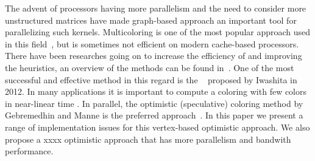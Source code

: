 The advent of processors having more parallelism and the need to consider more unstructured matrices have made graph-based approach an important tool for parallelizing such kernels. Multicoloring is one of the most popular approach used in this field~\cite{MC}, but is sometimes not efficient on modern cache-based processors. There have been researches going on to increase the efficiency of \MCfull and improving the heuristics, an overview of the methods can be found in~\cite{equitable_color,dist_k_def,COLPACK}. One of the most successful and effective method in this regard is the \ABMCfull~\cite{ABMC} proposed by Iwashita \etal in 2012. 
In many applications it is important to compute a coloring with few colors in near-linear time \cite{doi:10.1137/13093426X}. In parallel, the optimistic (speculative) coloring method by Gebremedhin and Manne \cite{gebremedhin2000scalable} is the preferred approach~\cite{Boman:2016}. In this paper we present a range of implementation issues for this vertex-based optimistic approach. We also propose a xxxx optimistic approach that has more parallelism and bandwith performance.



